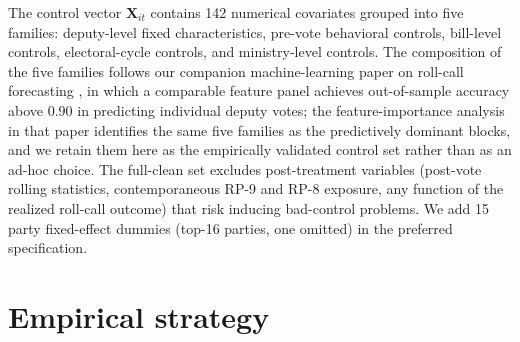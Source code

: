 \documentclass[pdflatex,sn-basic]{sn-jnl}
\begin{document}
The control vector $\mathbf{X}_{it}$ contains 142 numerical covariates grouped into five families: deputy-level fixed characteristics, pre-vote behavioral controls, bill-level controls, electoral-cycle controls, and ministry-level controls. The composition of the five families follows our companion machine-learning paper on roll-call forecasting \citep{CampeloCajueiro2025}, in which a comparable feature panel achieves out-of-sample accuracy above $0.90$ in predicting individual deputy votes; the feature-importance analysis in that paper identifies the same five families as the predictively dominant blocks, and we retain them here as the empirically validated control set rather than as an ad-hoc choice. The full-clean set excludes post-treatment variables (post-vote rolling statistics, contemporaneous RP-9 and RP-8 exposure, any function of the realized roll-call outcome) that risk inducing bad-control problems. We add 15 party fixed-effect dummies (top-16 parties, one omitted) in the preferred specification.

\section{Empirical strategy}
\label{sec:strategy}
\end{document}
